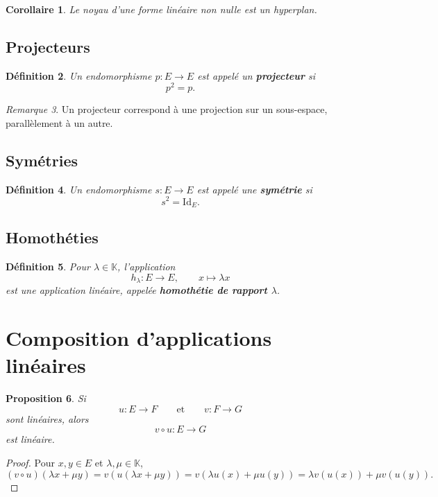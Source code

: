 \documentclass[11pt,a4paper]{article}
\newtheorem{definition}{Définition}[section]
\newtheorem{proposition}[definition]{Proposition}
\newtheorem{corollaire}[definition]{Corollaire}
\theoremstyle{remark}
\newtheorem{remarque}[definition]{Remarque}
\newcommand{\K}{\mathbb{K}}
\newcommand{\id}{\mathrm{Id}}
\begin{document}
\begin{corollaire}
Le noyau d’une forme linéaire non nulle est un hyperplan.
\end{corollaire}

\subsection{Projecteurs}

\begin{definition}
Un endomorphisme \(p:E\to E\) est appelé un \textbf{projecteur} si
\[
p^2=p.
\]
\end{definition}

\begin{remarque}
Un projecteur correspond à une projection sur un sous-espace, parallèlement à un autre.
\end{remarque}

\subsection{Symétries}

\begin{definition}
Un endomorphisme \(s:E\to E\) est appelé une \textbf{symétrie} si
\[
s^2=\id_E.
\]
\end{definition}

\subsection{Homothéties}

\begin{definition}
Pour \(\lambda\in\K\), l’application
\[
h_\lambda:E\to E,\qquad x\mapsto \lambda x
\]
est une application linéaire, appelée \textbf{homothétie de rapport \(\lambda\)}.
\end{definition}

\section{Composition d’applications linéaires}

\begin{proposition}
Si
\[
u:E\to F
\qquad \text{et} \qquad
v:F\to G
\]
sont linéaires, alors
\[
v\circ u:E\to G
\]
est linéaire.
\end{proposition}

\begin{proof}
Pour \(x,y\in E\) et \(\lambda,\mu\in\K\),
\[
(v\circ u)(\lambda x+\mu y)
=
v(u(\lambda x+\mu y))
=
v(\lambda u(x)+\mu u(y))
=
\lambda v(u(x))+\mu v(u(y)).
\]
\end{proof}
\end{document}
